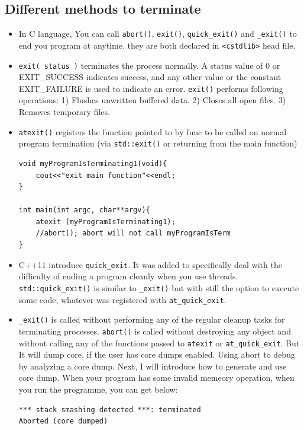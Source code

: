 \documentclass[a4paper,11pt,twoside]{book}
\begin{document}
\subsection{Different methods to terminate}
\begin{itemize}
	\item In C language, You can call \texttt{abort()}, \texttt{exit()}, \texttt{quick\_exit()} and  \texttt{\_exit()} to end you program at anytime. they are both declared in \texttt{<cstdlib>} head file.
	
	\item \texttt{exit( status )} terminates the process normally. A status value of 0 or EXIT\_SUCCESS indicates success, and any other value or the constant EXIT\_FAILURE is used to indicate an error. \texttt{exit()} performs following operations: 1) Flushes unwritten buffered data. 2) Closes all open files. 3) Removes temporary files.
	
	\item \texttt{atexit()} registers the function pointed to by func to be called on normal program termination (via \texttt{std::exit()} or returning from the main function)
\begin{lstlisting}[]
void myProgramIsTerminating1(void){
	cout<<"exit main function"<<endl;
}
	
int main(int argc, char**argv){
	atexit (myProgramIsTerminating1);
	//abort(); abort will not call myProgramIsTerm
}
\end{lstlisting}	

	\item C++11 introduce \texttt{quick\_exit}. It was added to specifically deal with the difficulty of ending a program cleanly when you use threads. \texttt{std::quick\_exit()} is similar to \texttt{\_exit()} but with still the option to execute some code, whatever was registered with \texttt{at\_quick\_exit}.
	
	\item \texttt{\_exit()} is called without performing any of the regular cleanup tasks for terminating processes. \texttt{abort()} is called without destroying any object and without calling any of the functions passed to \texttt{atexit} or \texttt{at\_quick\_exit}. But It will dump core, if the user has core dumps enabled. Using abort to debug by analyzing a core dump. Next, I will introduce how to generate and use core dump. When your program has some invalid memeory operation, when you run the programme, you can get below:
\begin{lstlisting}[]
*** stack smashing detected ***: terminated
Aborted (core dumped)
\end{lstlisting}


\end{itemize}
\end{document}
